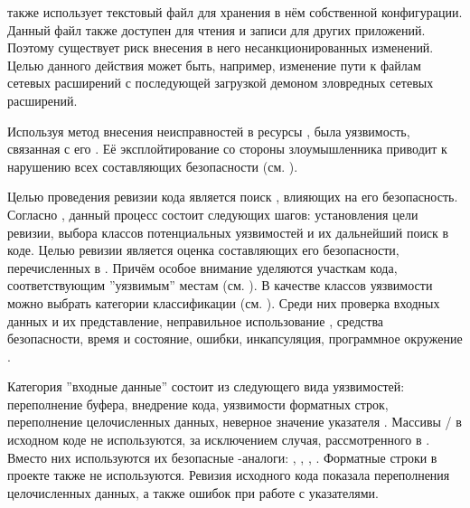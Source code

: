 %
 также использует текстовый файл для хранения в нём собственной конфигурации. 
%
Данный файл также доступен для чтения и записи для других приложений. 
%
Поэтому существует риск внесения в него несанкционированных изменений. 
%
Целью данного действия может быть, например, изменение пути к файлам сетевых расширений с последующей загрузкой демоном зловредных сетевых расширений.

%
Используя метод внесения неисправностей в ресурсы , была  уязвимость, связанная с его . 
%
Её эксплойтирование со стороны злоумышленника приводит к нарушению всех составляющих безопасности  (см. ).


%
Целью проведения ревизии кода  является поиск , влияющих на его безопасность.  
%
Согласно  , данный процесс состоит следующих шагов: установления цели ревизии, выбора классов потенциальных уязвимостей и их дальнейший поиск в коде. 
%
Целью ревизии  является оценка составляющих его безопасности, перечисленных в . 
%
Причём особое внимание уделяются участкам кода, соответствующим ''уязвимым'' местам (см. ). 
%
В качестве классов уязвимости можно выбрать категории классификации  (см. ). 
%
Среди них проверка входных данных и их представление, неправильное использование , средства безопасности, время и состояние, ошибки, инкапсуляция, программное окружение . 

%
Категория ''входные данные'' состоит из следующего вида уязвимостей: переполнение буфера, внедрение кода, уязвимости форматных строк, переполнение целочисленных данных, неверное значение указателя . 
%
Массивы / в исходном коде  не используются, за исключением случая, рассмотренного в . 
%
Вместо них используются их безопасные -аналоги: , , ,  . 
%
Форматные строки в проекте также не используются. 
%
Ревизия исходного кода показала  переполнения целочисленных данных, а также ошибок при работе с указателями. 

